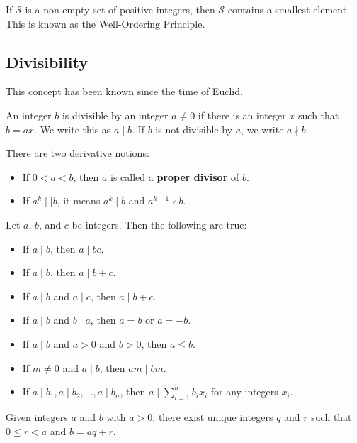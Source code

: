 \documentclass[11pt]{article}
\begin{document}
\begin{fact}
    If \(\mathcal{S}\) is a non-empty set of positive integers, then \(\mathcal{S}\) contains a smallest element. This is known as the Well-Ordering Principle.
\end{fact}

\subsection{Divisibility}
This concept has been known since the time of Euclid.

\begin{definition}
    An integer $b$ is divisible by an integer $a \neq 0$ if there is an integer $x$ such that $b = ax$. We write this as $a \mid b$. If $b$ is not divisible by $a$, we write $a \nmid b$.
\end{definition}

There are two derivative notions:
\begin{itemize}
    \item If $0 < a < b$, then $a$ is called a \textbf{proper divisor} of $b$.
    \item If $a^k \mid\mid b$, it means $a^k \mid b$ and $a^{k + 1} \nmid b$.
\end{itemize}

\begin{theorem}
    Let $a$, $b$, and $c$ be integers. Then the following are true:
    \begin{itemize}
        \item If $a \mid b$, then $a \mid bc$.
        \item If $a \mid b$, then $a \mid b + c$.
        \item If $a \mid b$ and $a \mid c$, then $a \mid b + c$.
        \item If $a \mid b$ and $b \mid a$, then $a = b$ or $a = -b$.
        \item If $a \mid b$ and $a > 0$ and $b > 0$, then $a \leq b$.
        \item If $m \neq 0$ and $a \mid b$, then $am \mid bm$.
        \item If $a \mid b_1, a \mid b_2, \ldots, a \mid b_n$, then $a \mid \sum_{i=1}^{n} b_i x_i$ for any integers $x_i$.
    \end{itemize}
\end{theorem}

\begin{theorem}
    Given integers $a$ and $b$ with $a > 0$, there exist unique integers $q$ and $r$ such that $0 \leq r < a$ and $b = aq + r$.
\end{theorem}
\end{document}
